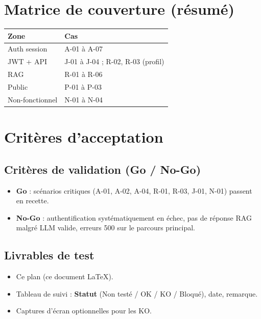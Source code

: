 \documentclass[11pt,a4paper]{article}
\begin{document}
\section{Matrice de couverture (résumé)}
\begin{center}
\small
\begin{tabular}{@{}l@{\quad}l@{}}
\toprule
\textbf{Zone} & \textbf{Cas} \\
\midrule
Auth session & A-01 à A-07 \\
JWT + API & J-01 à J-04 ; R-02, R-03 (profil) \\
RAG & R-01 à R-06 \\
Public & P-01 à P-03 \\
Non-fonctionnel & N-01 à N-04 \\
\bottomrule
\end{tabular}
\end{center}

\section{Critères d'acceptation}

\subsection{Critères de validation (Go / No-Go)}
\begin{itemize}[leftmargin=*]
  \item \textbf{Go} : scénarios critiques (A-01, A-02, A-04, R-01, R-03, J-01, N-01) passent en recette.
  \item \textbf{No-Go} : authentification systématiquement en échec, pas de réponse RAG malgré LLM valide, erreurs 500 sur le parcours principal.
\end{itemize}

\subsection{Livrables de test}
\begin{itemize}[leftmargin=*]
  \item Ce plan (ce document \LaTeX).
  \item Tableau de suivi : \textbf{Statut} (Non testé / OK / KO / Bloqué), date, remarque.
  \item Captures d'écran optionnelles pour les KO.
\end{itemize}
\end{document}
